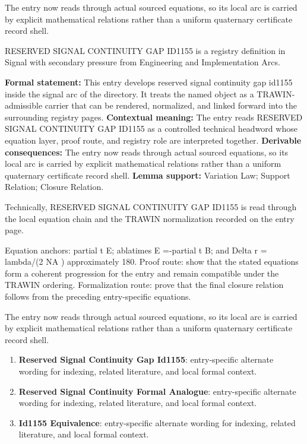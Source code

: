 The entry now reads through actual sourced equations, so its local arc is carried by explicit mathematical relations rather than a uniform quaternary certificate record shell.
\clearpage


\begingroup\small
{}
RESERVED SIGNAL CONTINUITY GAP ID1155 is a registry definition in Signal with secondary pressure from Engineering and Implementation Arcs.

\begingroup\footnotesize\setlength{\emergencystretch}{3em}\sloppy
\textbf{Formal statement:} This entry develops reserved signal continuity gap id1155 inside the signal arc of the directory. It treats the named object as a TRAWIN-admissible carrier that can be rendered, normalized, and linked forward into the surrounding registry pages. \textbf{Contextual meaning:} The entry reads RESERVED SIGNAL CONTINUITY GAP ID1155 as a controlled technical headword whose equation layer, proof route, and registry role are interpreted together. \textbf{Derivable consequences:} The entry now reads through actual sourced equations, so its local arc is carried by explicit mathematical relations rather than a uniform quaternary certificate record shell. \textbf{Lemma support:} Variation Law; Support Relation; Closure Relation.\par
\endgroup

Technically, RESERVED SIGNAL CONTINUITY GAP ID1155 is read through the local equation chain and the TRAWIN normalization recorded on the entry page.

Equation anchors: partial t E; ablatimes E =-partial t B; and Delta r = lambda/(2 NA ) approximately 180. Proof route: show that the stated equations form a coherent progression for the entry and remain compatible under the TRAWIN ordering. Formalization route: prove that the final closure relation follows from the preceding entry-specific equations.

The entry now reads through actual sourced equations, so its local arc is carried by explicit mathematical relations rather than a uniform quaternary certificate record shell.
\endgroup

\begin{enumerate}[leftmargin=1.6em,itemsep=6pt,topsep=4pt]
\item \textbf{Reserved Signal Continuity Gap Id1155}: entry-specific alternate wording for indexing, related literature, and local formal context.
\item \textbf{Reserved Signal Continuity Formal Analogue}: entry-specific alternate wording for indexing, related literature, and local formal context.
\item \textbf{Id1155 Equivalence}: entry-specific alternate wording for indexing, related literature, and local formal context.
\end{enumerate}

